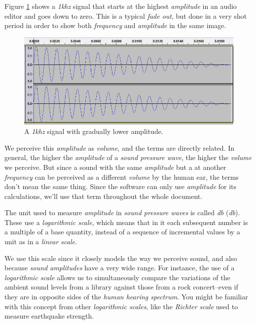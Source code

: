 \documentclass[10pt,a4paper]{report}
\newcommand{\define}[1]{\textit{\acrlong{#1}} (\textit{\acrshort{#1}})}
\newcommand{\khz}[1]{\textit{#1\acrshort{khz}}}
\begin{document}
Figure \ref{fig:amplitude} shows a \khz{1} signal that starts at the highest \textit{amplitude} in an audio editor and goes down to zero. This is a typical \textit{fade out}, but done in a very shot period in order to show both \textit{frequency} and \textit{amplitude} in the same image.

\begin{figure}[H]
	\centering
	\includegraphics[width=0.8\linewidth]{images/audio/amplitude.png}
	\caption[amplitude]{A \khz{1} signal with gradually lower amplitude.}
	\label{fig:amplitude}
\end{figure}

We perceive this \textit{amplitude} as \textit{volume}, and the terms are directly related. In general, the higher the \textit{amplitude} of a \textit{sound pressure wave}, the higher the \textit{volume} we perceive. But since a sound with the same  \textit{amplitude} but a at another \textit{frequency} can be perceived as a different \textit{volume} by the human ear, the terms don't mean the same thing. Since the software can only use \textit{amplitude} for its calculations, we'll use that term throughout the whole document.

The unit used to measure \textit{amplitude} in \textit{sound pressure waves} is called \define{db}. These use a \textit{logarithmic scale}, which means that in it each subsequent number is a multiple of a base quantity, instead of a sequence of incremental values by a unit as in a \textit{linear scale}. 

We use this scale since it closely models the way we perceive sound, and also because \textit{sound amplitudes} have a very wide range. For instance, the use of a \textit{logarithmic scale} allows us to simultaneously compare the variations of the ambient sound levels from a library against those from a rock concert--even if they are in opposite sides of the \textit{human hearing spectrum}. You might be familiar with this concept from other \textit{logarithmic scales}, like the \textit{Richter scale} used to measure earthquake strength.
\end{document}
